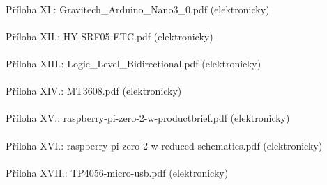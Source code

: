 \documentclass[12pt]{article}
\begin{document}
\begin{spacing}{1.5}
\begin{spacing}{1}
		\paragraph{} Příloha XI.: Gravitech\_Arduino\_Nano3\_0.pdf (elektronicky)
		\paragraph{} Příloha XII.: HY-SRF05-ETC.pdf (elektronicky)
		\paragraph{} Příloha XIII.: Logic\_Level\_Bidirectional.pdf (elektronicky)
		\paragraph{} Příloha XIV.: MT3608.pdf (elektronicky)
		\paragraph{} Příloha XV.: raspberry-pi-zero-2-w-productbrief.pdf (elektronicky)
		\paragraph{} Příloha XVI.: raspberry-pi-zero-2-w-reduced-schematics.pdf (elektronicky)
		\paragraph{} Příloha XVII.: TP4056-micro-usb.pdf (elektronicky)
	\end{spacing}
	
	
	
\end{spacing}
\end{document}
